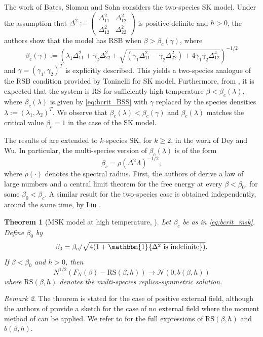 \documentclass[11pt]{article}
\numberwithin{equation}{section}
\newcommand{\beq}{ \begin{equation} }
\newcommand{\eeq}{ \end{equation} }
\def \b {\beta}
\def \g {\gamma}
\def \la {\lambda}
\def \cN {\mathcal{N}}
\newtheorem{theorem}{Theorem}[section]
\theoremstyle{remark}
\newtheorem{remark}[theorem]{Remark}
\begin{document}
The work \cite{BatesSlomanSohn19} of Bates, Sloman and Sohn considers the two-species SK model. Under the assumption that 
$\Delta^2 := \begin{pmatrix}  \Delta^2_{11} & \Delta^2_{12}\\
\Delta^2_{12} & \Delta^2_{22}
\end{pmatrix}$ is positive-definite and $h>0$, the authors show that the model has RSB when $\b >\b_c(\g)$, where 
\beq\label{eq:bcrit_BSS}
\b_c(\g):= \left(\la_1  \Delta^2_{11} + \g_2 \Delta^2_{22}  + \sqrt{(\g_1 \Delta^2_{11} -\g_2  \Delta^2_{22}) + 4\g_1\g_2 \Delta^4_{12} } \right)^{-1/2}
\eeq
and $\g = (\g_1,\g_2)^T$ is explicitly described. This yields a two-species analogue of the RSB condition provided by Toninelli \cite{Toninelli_2002} for SK model. Furthermore, from \cite{BatesSlomanSohn19}, it is expected that the system is RS for sufficiently high temperature $\b<\b_c(\la)$, where $\b_c(\la)$ is given by \eqref{eq:bcrit_BSS} with $\g$ replaced by the species densities $\la := (\la_1, \la_2)^T$. We observe that $\b_c(\la)< \b_c(\g)$ and $\b_c(\la)$ matches the critical value $\b_c=1$ in the case of the SK model. 

The results of \cite{BatesSlomanSohn19} are extended to $k$-species SK, for $k\geq 2$, in the work \cite{DeyWu21} of Dey and Wu. In particular, the multi-species version of $\b_c(\la)$ is of the form 
\beq\label{eq:bcrit_msk}
\b_c= \rho(\Delta^2\Lambda)^{-1/2},
\eeq
where $\rho(\cdot)$ denotes the spectral radius. First, the authors of \cite{DeyWu21} derive a law of large numbers and a central limit theorem for the free energy at every $\b< \b_0$, for some $\b_0<\b_c$. A similar result for the two-species case is obtained independently, around the same time, by Liu \cite{Liu21}.

\begin{theorem}[MSK model at high temperature, ]
Let $\b_c$ be as in \eqref{eq:bcrit_msk}. Define $\b_0$ by 
\[
\b_0 = \b_c/\sqrt{4(1+\mathbbm{1}\{\Delta^2 \text{ is indefinite}\})}.
\]
If $\b < \b_0$ and $h>0$, then 
\[
N^{1/2}\left(F_N(\b) - \mathrm{RS}(\b, h) \right) \to \cN(0, b(\b,h))
\]
where $\mathrm{RS}(\b, h)$ denotes the multi-species replica-symmetric solution. 
\end{theorem}

\begin{remark}
The theorem is stated for the case of positive external field, although the authors of \cite{DeyWu21} provide a sketch for the case of no external field where the moment method of \cite[Chapter 11]{Talagrandvol2} can be applied. We refer to  for the full expressions of $\mathrm{RS}(\b, h)$ and $b(\b,h)$. 
\end{remark}
\end{document}
